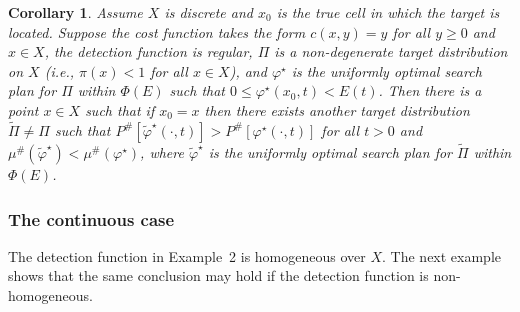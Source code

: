 \documentclass[12pt]{article}
\theoremstyle{plain}
\newtheorem{cor}{Corollary}
\theoremstyle{definition}
\theoremstyle{remark}
\begin{document}
\begin{cor}
\label{cor:nooptdiscrete1}
Assume $X$ is discrete and $x_0$ is the true cell in which the target is located.  Suppose the cost function takes the form $c(x,y)=y$ for all $y\geq 0$ and $x \in X$,  the detection function is  regular,  $\Pi$ is a non-degenerate target distribution on $X$ (i.e., $\pi(x)<1$ for all $x\in X$), and $\varphi^\star$ is the uniformly optimal search plan for $\Pi$ within $\Phi(E)$ such that $0\leq \varphi^\star(x_0, t)<E(t)$.  Then there  is a point $x\in X$ such that if $x_0=x$ then there exists another target distribution $\widetilde{\Pi}\neq \Pi$ such that $P^{\#}[\widetilde{\varphi}^\star(\cdot, t)]>P^{\#}[\varphi^\star(\cdot, t)]$ for all $t>0$ and $\mu^{\#}(\widetilde{\varphi}^\star)<\mu^{\#}(\varphi^\star)$, where $\widetilde{\varphi}^\star$ is the uniformly optimal search plan for $\widetilde{\Pi}$ within $\Phi(E)$.
\end{cor}




\subsubsection{The continuous case}

The detection function in Example~2 is homogeneous over $X$. The next example shows that the same conclusion may hold if the detection function is non-homogeneous.
\end{document}
